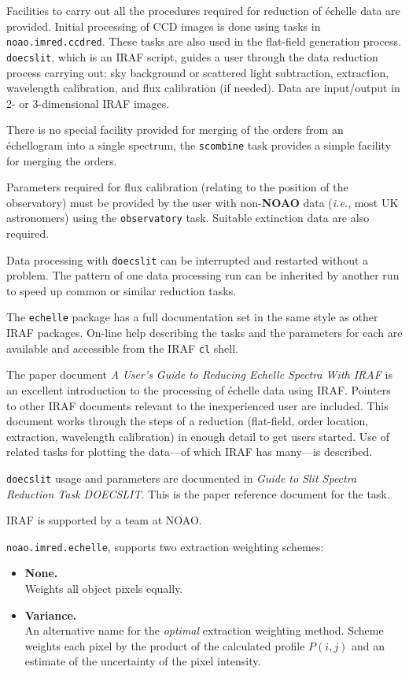 \documentclass[twoside,11pt]{article}
\newcommand{\htmlref}[2]{#1}
\newcommand{\sgspec}[2]{#1}
\newcommand{\sgspec}[2]{#2}
\begin{document}
Facilities to carry out all the procedures required for reduction of
\'{e}chelle data are provided.  Initial processing of CCD images is done
using tasks in {\tt noao.imred.ccdred}\@.  These tasks are also used in the
flat-field generation process.  {\tt doecslit}, which is an IRAF script,
guides a user through the data reduction process carrying out; sky
background or scattered light subtraction, extraction, wavelength
calibration, and flux calibration (if needed).  Data are input/output in
2- or 3-dimensional IRAF images.

There is no special facility provided for merging of the orders from an
\'{e}chellogram into a single spectrum, the {\tt scombine} task provides
a simple facility for merging the orders.

Parameters required for flux calibration (relating to the position of the
observatory) must be provided by the user with
non-\htmlref{{\bf{NOAO}}}{gl_noao} data ({\em{i.e.}},
most UK astronomers) using the {\tt observatory} task.
Suitable extinction data are also required.

Data processing with {\tt doecslit} can be interrupted and restarted
without a problem.  The pattern of one data processing run can be inherited
by another run to speed up common or similar reduction tasks.

The {\tt echelle} package has a full documentation set in the same style as
other IRAF packages.  On-line help describing the tasks and the parameters
for each are available and accessible from the IRAF {\tt cl} shell.

The paper document {\sl A User's Guide to Reducing Echelle Spectra With
IRAF} is an excellent introduction to the processing of \'{e}chelle data
using IRAF\@.  Pointers to other IRAF documents relevant to the inexperienced
user are included.  This document works through the steps of a reduction
(flat-field, order location, extraction, wavelength calibration) in enough
detail to get users started. Use of related tasks for plotting the
data\sgspec{---}{ - }of which IRAF has many\sgspec{---}{ - }is described.

{\tt doecslit} usage and parameters are documented in {\sl Guide to Slit
Spectra Reduction Task DOECSLIT}\@.  This is the paper reference document
for the task.

IRAF is supported by a team at NOAO\@.

{\tt noao.imred.echelle}, supports two extraction weighting schemes:

\begin{itemize}

\item {\bf{None.}} \mbox{}\\
      Weights all object pixels equally.

\item {\bf{Variance.}} \mbox{}\\
      An alternative name for the {\em optimal} extraction weighting
      method.
      Scheme weights each pixel by the product of the calculated profile
      $P(i,j)$ and an estimate of the uncertainty of the pixel intensity.

\end{itemize}
\end{document}
